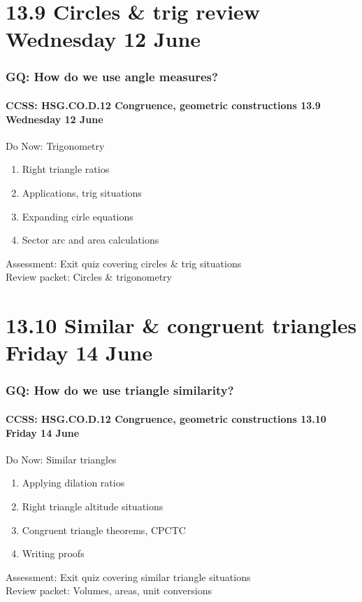 \documentclass{beamer}
\begin{document}
  \section{13.9 Circles \& trig review Wednesday 12 June}
    \frame
    {
      \frametitle{GQ: How do we use angle measures?}
      \framesubtitle{CCSS: HSG.CO.D.12 Congruence, geometric constructions \hfill \alert{13.9  Wednesday 12 June}}

      \begin{block}{Do Now: Trigonometry}
        \begin{enumerate}
          \item Right triangle ratios
          \item Applications, trig situations
          \item Expanding cirle equations
          \item Sector arc and area calculations
        \end{enumerate}
      \end{block}
      Assessment: Exit quiz covering circles \& trig situations\\
      Review packet: Circles \& trigonometry
    }

  \section{13.10 Similar \& congruent triangles Friday 14 June}
    \frame
    {
      \frametitle{GQ: How do we use triangle similarity?}
      \framesubtitle{CCSS: HSG.CO.D.12 Congruence, geometric constructions \hfill \alert{13.10 Friday 14 June}}

      \begin{block}{Do Now: Similar triangles}
        \begin{enumerate}
          \item Applying dilation ratios
          \item Right triangle altitude situations
          \item Congruent triangle theorems, CPCTC
          \item Writing proofs
        \end{enumerate}
      \end{block}
      Assessment: Exit quiz covering similar triangle situations\\
      Review packet: Volumes, areas, unit conversions
    }
\end{document}
